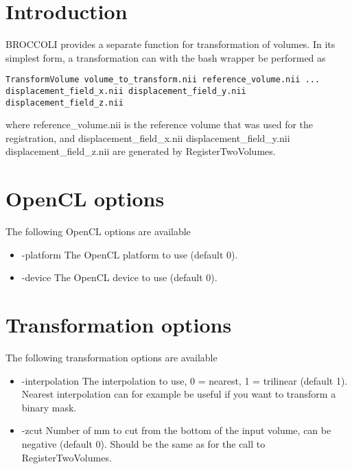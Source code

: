 \section{Introduction}

BROCCOLI provides a separate function for transformation of volumes. In its simplest form, a transformation can with the bash wrapper be performed as

\begin{verbatim}
TransformVolume volume_to_transform.nii reference_volume.nii ... 
displacement_field_x.nii displacement_field_y.nii displacement_field_z.nii
\end{verbatim}
where reference\_volume.nii is the reference volume that was used for the registration, and displacement\_field\_x.nii displacement\_field\_y.nii displacement\_field\_z.nii are generated by RegisterTwoVolumes.

\section{OpenCL options}

The following OpenCL options are available

\begin{itemize}

\item -platform
\newline \newline The OpenCL platform to use (default 0).

\item -device
\newline \newline The OpenCL device to use (default 0).

\end{itemize}

\newpage

\section{Transformation options}

The following transformation options are available

\begin{itemize}

\item -interpolation
\newline \newline The interpolation to use, 0 = nearest, 1 = trilinear (default 1). Nearest interpolation can for example be useful if you want to transform a binary mask.

\item -zcut
\newline \newline Number of mm to cut from the bottom of the input volume, can be negative (default 0). Should be the same as for the call to RegisterTwoVolumes.

\end{itemize}

